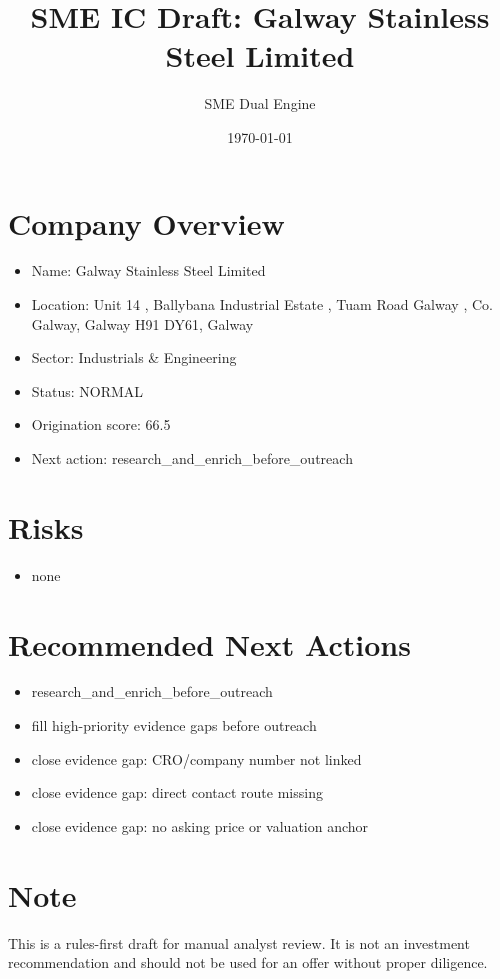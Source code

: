 \documentclass[11pt,a4paper]{article}
\title{SME IC Draft: Galway Stainless Steel Limited}
\author{SME Dual Engine}
\date{\today}
\begin{document}
\maketitle
\section*{Company Overview}
\begin{itemize}[leftmargin=1.4em]
\item Name: Galway Stainless Steel Limited
\item Location: Unit 14 , Ballybana Industrial Estate , Tuam Road Galway , Co. Galway, Galway H91 DY61, Galway
\item Sector: Industrials \& Engineering
\item Status: NORMAL
\item Origination score: 66.5
\item Next action: research\_and\_enrich\_before\_outreach
\end{itemize}
\section*{Risks}
\begin{itemize}[leftmargin=1.4em]
\item none
\end{itemize}
\section*{Recommended Next Actions}
\begin{itemize}[leftmargin=1.4em]
\item research\_and\_enrich\_before\_outreach
\item fill high-priority evidence gaps before outreach
\item close evidence gap: CRO/company number not linked
\item close evidence gap: direct contact route missing
\item close evidence gap: no asking price or valuation anchor
\end{itemize}
\section*{Note}
This is a rules-first draft for manual analyst review. It is not an investment
recommendation and should not be used for an offer without proper diligence.
\end{document}
